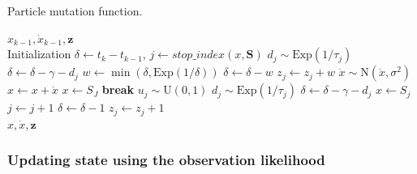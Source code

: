 \renewcommand{\algorithmicrequire}{\textbf{Start:}}
\newcommand{\algorithmicbreak}{\textbf{break}}
\newcommand{\Break}{\State \algorithmicbreak}
\begin{algorithm}[tb]
    \caption{Particle mutation function.}
    \label{fig:algorithm}
    \begin{algorithmic}[2]
    \Require $x_{k-1}, \dot x_{k-1}, \boldsymbol z$\\
    Initialization $\delta \gets t_k - t_{k-1}$, 
        $j \gets stop\_index(x, \boldsymbol{S})$
        \State $d_j \sim \mathrm{Exp}(1/\tau_j)$
        \State $\delta \gets \delta - \gamma - d_j$
        \State $w \gets \min(\delta, \mathrm{Exp}(1/\delta))$
        \State $\delta \gets \delta - w$
        \State $z_j \gets z_j + w$
    \EndIf
        \State $\dot x \sim \mathrm{N}(\dot x, \sigma^2)$
        \State $x \leftarrow x + \dot x$
                \State $x \gets S_J$
                \Break
            \EndIf
            \State $u_j \sim \mathrm{U}(0,1)$
                \State $d_j \sim \mathrm{Exp}(1/\tau_j)$
                \State $\delta \gets \delta - \gamma - d_j$
                \State $x \gets S_j$
            \EndIf
            \State $j\gets j+1$
        \EndIf
        \State $\delta \gets \delta - 1$
        \State $z_j \gets z_j + 1$
    \EndWhile
    \\
    \Return $x, \dot x, \boldsymbol z$
    \end{algorithmic}
\end{algorithm}



\subsubsection{Updating state using the observation likelihood}
\label{sec:pf_update}

